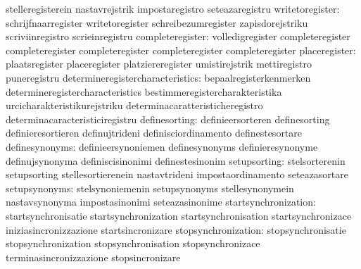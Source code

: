                                   stelleregisterein                nastavrejstrik
                                  impostaregistro                  seteazaregistru
                 writetoregister: schrijfnaarregister              writetoregister
                                  schreibezumregister              zapisdorejstriku
                                  scriviinregistro                 scrieinregistru
completeregister: volledigregister              completeregister
                  completeregister              completeregister
                  completeregister              completeregister
                   placeregister: plaatsregister                   placeregister
                                  platziereregister                umistirejstrik
                                  mettiregistro                    puneregistru
determineregistercharacteristics: bepaalregisterkenmerken          determineregistercharacteristics
                                  bestimmeregistercharakteristika  urcicharakteristikurejstriku
                                  determinacaratteristicheregistro determinacaracteristiciregistru
                   definesorting: definieersorteren                definesorting
                                  definieresortieren               definujtrideni
                                  definisciordinamento             definestesortare
                  definesynonyms: definieersynoniemen              definesynonyms
                                  definieresynonyme                definujsynonyma
                                  definiscisinonimi                definestesinonim
                    setupsorting: stelsorterenin                   setupsorting
                                  stellesortierenein               nastavtrideni
                                  impostaordinamento               seteazasortare
                   setupsynonyms: stelsynoniemenin                 setupsynonyms
                                  stellesynonymein                 nastavsynonyma
                                  impostasinonimi                  seteazasinonime
            startsynchronization: startsynchronisatie              startsynchronization
                                  startsynchronisation             startsynchronizace
                                  iniziasincronizzazione           startsincronizare
             stopsynchronization: stopsynchronisatie               stopsynchronization
                                  stopsynchronisation              stopsynchronizace
                                  terminasincronizzazione          stopsincronizare
